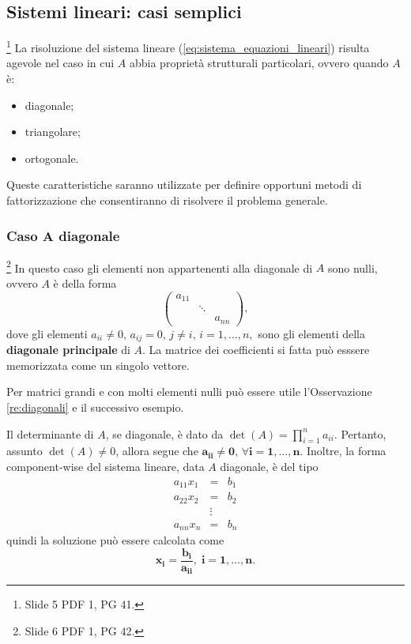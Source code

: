 \subsection{Sistemi lineari: casi semplici}\footnote{Slide 5 PDF 1, PG 41.}
La risoluzione del sistema lineare (\ref{eq:sistema_equazioni_lineari}) risulta agevole nel caso in cui $A$ abbia proprietà strutturali particolari, ovvero quando $A$ è:
\begin{itemize}
    \item diagonale;
    \item triangolare;
    \item ortogonale.
\end{itemize}
Queste caratteristiche saranno utilizzate per definire opportuni metodi di fattorizzazione che consentiranno di risolvere il problema generale.

\subsubsection{Caso \texorpdfstring{$\boldsymbol A$}{A} diagonale}\footnote{Slide 6 PDF 1, PG 42.}
In questo caso gli elementi non appartenenti alla diagonale di $A$ sono nulli, ovvero $A$ è della forma
\begin{equation*}
    \begin{pmatrix}
        a_{11}&&\\
        &\ddots&\\
        &&a_{nn}
    \end{pmatrix},
\end{equation*}
dove gli elementi $a_{ii}\neq 0,\, a_{ij}=0,\, j\neq i,\, i=1,\hdots, n, $ sono gli elementi della \textbf{diagonale principale} di $A$. La matrice dei coefficienti si fatta può esssere memorizzata come un singolo vettore.

\begin{remark}
    Per matrici grandi e con molti elementi nulli può essere utile l'Osservazione \ref{re:diagonali} e il successivo esempio.
\end{remark}

Il determinante di $A$, se diagonale, è dato da $\det(A)=\prod_{i=1}^n a_{ii}.$ Pertanto, assunto $\det(A)\neq 0$, allora segue che $\boldsymbol{a_{ii}\neq 0,\, \forall i=1,\hdots,n}.$ Inoltre, la forma component-wise del sistema lineare, data $A$ diagonale, è del tipo
\begin{equation*}
    \begin{matrix}
        a_{11} x_1 &=& b_1\\
        a_{22} x_2 &=& b_2\\
        &\vdots&\\
        a_{nn}x_n &=& b_n
    \end{matrix}
\end{equation*}
quindi la soluzione può essere calcolata come
\begin{equation*}
    \boldsymbol{x_i=\frac{b_i}{a_{ii}},\; i=1,\hdots, n.}
\end{equation*}

